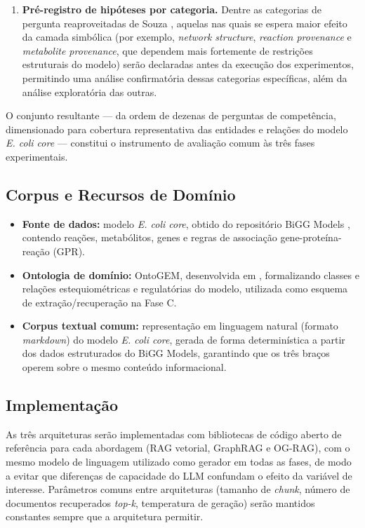 \documentclass{article}
\begin{document}
\begin{enumerate}
		\item \textbf{Pré-registro de hipóteses por categoria.} Dentre as categorias de pergunta reaproveitadas de Souza \cite{souza2025ontogem}, aquelas nas quais se espera maior efeito da camada simbólica (por exemplo, \textit{network structure}, \textit{reaction provenance} e \textit{metabolite provenance}, que dependem mais fortemente de restrições estruturais do modelo) serão declaradas antes da execução dos experimentos, permitindo uma análise confirmatória dessas categorias específicas, além da análise exploratória das outras.
	\end{enumerate}
	
	O conjunto resultante --- da ordem de dezenas de perguntas de competência, dimensionado para cobertura representativa das entidades e relações do modelo \textit{E. coli core} --- constitui o instrumento de avaliação comum às três fases experimentais.
	
	\subsection{Corpus e Recursos de Domínio}
	
	\begin{itemize}
		\item \textbf{Fonte de dados:} modelo \textit{E. coli core}, obtido do repositório BiGG Models \cite{king2016bigg}, contendo reações, metabólitos, genes e regras de associação gene-proteína-reação (GPR).
		\item \textbf{Ontologia de domínio:} OntoGEM, desenvolvida em \cite{souza2025ontogem}, formalizando classes e relações estequiométricas e regulatórias do modelo, utilizada como esquema de extração/recuperação na Fase C.
		\item \textbf{Corpus textual comum:} representação em linguagem natural (formato \textit{markdown}) do modelo \textit{E. coli core}, gerada de forma determinística a partir dos dados estruturados do BiGG Models, garantindo que os três braços operem sobre o mesmo conteúdo informacional.
		
	\end{itemize}
	
	\subsection{Implementação}
	
	As três arquiteturas serão implementadas com bibliotecas de código aberto de referência para cada abordagem (RAG vetorial, GraphRAG e OG-RAG), com o mesmo modelo de linguagem utilizado como gerador em todas as fases, de modo a evitar que diferenças de capacidade do LLM confundam o efeito da variável de interesse. Parâmetros comuns entre arquiteturas (tamanho de \textit{chunk}, número de documentos recuperados \textit{top-k}, temperatura de geração) serão mantidos constantes sempre que a arquitetura permitir.
	
\end{document}
